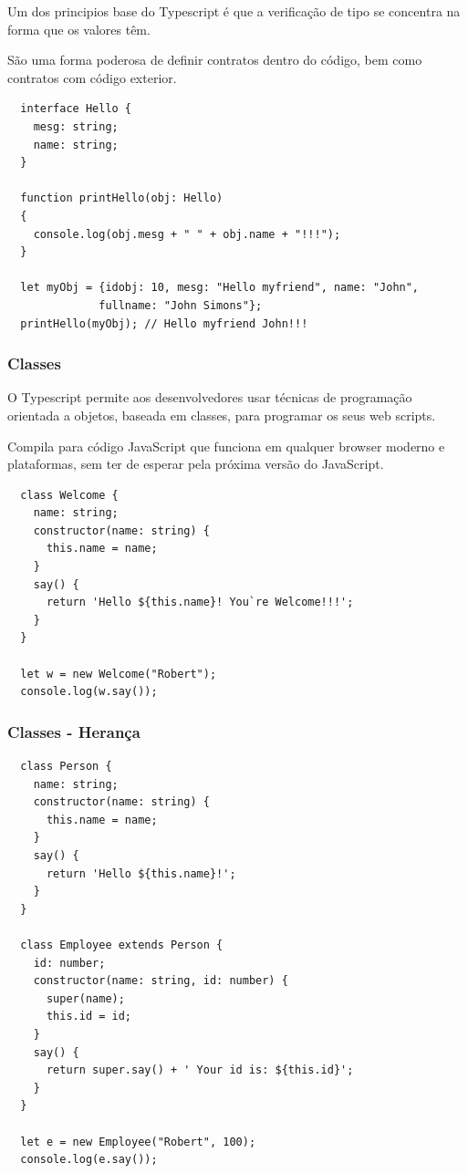 \documentclass{article}
\begin{document}
Um dos principios base do Typescript é que a verificação de tipo se concentra
na forma que os valores têm.

São uma forma poderosa de definir contratos dentro do código, bem como contratos
com código exterior.

\begin{lstlisting}
  interface Hello {
    mesg: string;
    name: string;
  }

  function printHello(obj: Hello)
  {
    console.log(obj.mesg + " " + obj.name + "!!!");
  }

  let myObj = {idobj: 10, mesg: "Hello myfriend", name: "John",
              fullname: "John Simons"};
  printHello(myObj); // Hello myfriend John!!!
\end{lstlisting}

\subsubsection{Classes}

O Typescript permite aos desenvolvedores usar técnicas de programação orientada
a objetos, baseada em classes, para programar os seus web scripts.

Compila para código JavaScript que funciona em qualquer browser moderno
e plataformas, sem ter de esperar pela próxima versão do JavaScript.

\begin{lstlisting}
  class Welcome {
    name: string;
    constructor(name: string) {
      this.name = name;
    }
    say() {
      return 'Hello ${this.name}! You`re Welcome!!!';
    }
  }

  let w = new Welcome("Robert");
  console.log(w.say());
\end{lstlisting}

\pagebreak

\subsubsection{Classes - Herança}

\begin{lstlisting}
  class Person {
    name: string;
    constructor(name: string) {
      this.name = name;
    }
    say() {
      return 'Hello ${this.name}!';
    }
  }

  class Employee extends Person {
    id: number;
    constructor(name: string, id: number) {
      super(name);
      this.id = id;
    }
    say() {
      return super.say() + ' Your id is: ${this.id}';
    }
  }

  let e = new Employee("Robert", 100);
  console.log(e.say());
\end{lstlisting}
\end{document}

